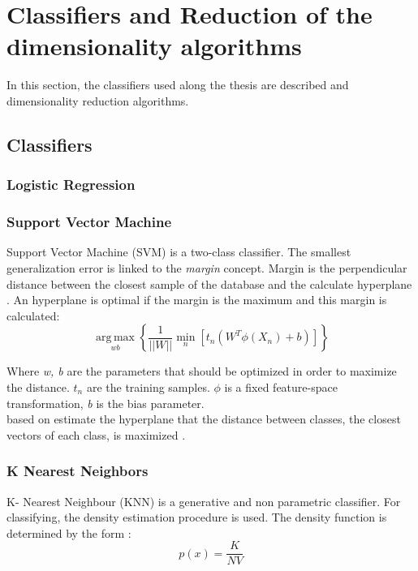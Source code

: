 \section{Classifiers and Reduction of the dimensionality algorithms}
In this section, the classifiers used along the thesis are described and dimensionality reduction algorithms.\\
\subsection{Classifiers}

\subsubsection{Logistic Regression}

\subsubsection{Support Vector Machine}
Support Vector Machine (SVM) is a two-class classifier. The smallest generalization error is linked  to the \textit{margin} concept. Margin is the perpendicular distance between the closest sample of the database and the calculate hyperplane \cite{MachineLearning}. An hyperplane is optimal if the margin is the maximum and this margin is calculated:\\

\begin{equation}
\underset{w b}{\operatorname{arg\,max}}\left \{ \frac{1}{||W||} \underset{n}{\operatorname{min}}[t_{n}(W^T \phi (X_n)+b)]   \right \}
\end{equation}

Where \textit{w, b} are the parameters that should be optimized in order to maximize the distance. \textit{$t_n$} are the training samples. $\phi$ is a fixed feature-space transformation, \textit{b} is the bias parameter.\\

based on estimate the hyperplane that the distance between classes, the closest vectors of each class, is maximized \cite{SVM1, MachineLearning}.

\subsubsection{K Nearest Neighbors}
K- Nearest Neighbour (KNN) is a generative and non parametric classifier. For classifying, the density estimation procedure is used. The density function is determined by the form \cite{MachineLearning}:
\begin{equation}
p(x) = \frac{K}{N V}
\end{equation}

